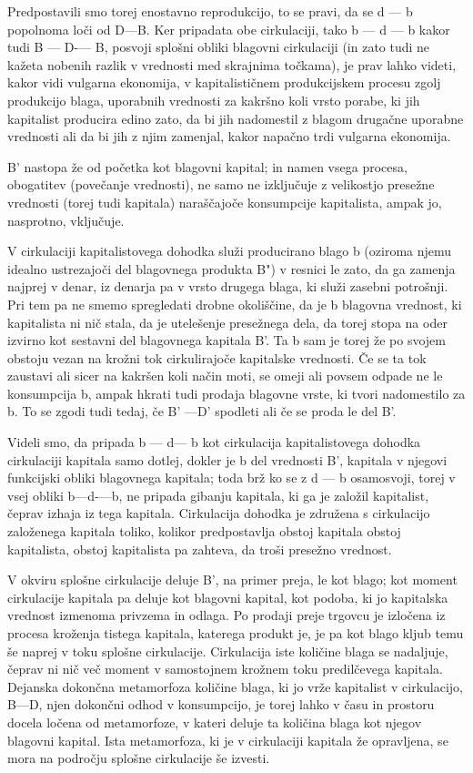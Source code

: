 \documentclass[kapital_02.tex]{subfiles}
\begin{document}
Predpostavili smo torej enostavno reprodukcijo, to se pravi, da se d — b popolnoma loči od D—B. Ker pripadata obe cirkulaciji, tako b — d — b kakor tudi B — D-— B, posvoji splošni obliki blagovni cirkulaciji (in zato tudi ne kažeta nobenih razlik v vrednosti med skrajnima točkama), je prav lahko videti, kakor vidi vulgarna ekonomija, v kapitalističnem produkcijskem procesu zgolj produkcijo blaga, uporabnih vrednosti za kakršno koli vrsto porabe, ki jih kapitalist producira edino zato, da bi jih nadomestil z blagom drugačne uporabne vrednosti ali da bi jih z njim zamenjal, kakor napačno trdi vulgarna ekonomija.

B' nastopa že od početka kot blagovni kapital; in namen vsega procesa, obogatitev (povečanje vrednosti), ne samo ne izključuje z velikostjo presežne vrednosti (torej tudi kapitala) naraščajoče konsumpcije kapitalista, ampak jo, nasprotno, vključuje.

V cirkulaciji kapitalistovega dohodka služi producirano blago b (oziroma njemu idealno ustrezajoči del blagovnega produkta B") v resnici le zato, da ga zamenja najprej v denar, iz denarja pa v vrsto drugega blaga, ki služi zasebni potrošnji. Pri tem pa ne smemo spregledati drobne okoliščine, da je b blagovna vrednost, ki kapitalista ni nič stala, da je utelešenje presežnega dela, da torej stopa na oder izvirno kot sestavni del blagovnega kapitala B'. Ta b sam je torej že po svojem obstoju vezan na krožni tok cirkulirajoče kapitalske vrednosti. Če se ta tok zaustavi ali sicer na kakršen koli način moti, se omeji ali povsem odpade ne le konsumpcija b, ampak hkrati tudi prodaja blagovne vrste, ki tvori nadomestilo za b. To se zgodi tudi tedaj, če B' —D' spodleti ali če se proda le del B'.

Videli smo, da pripada b — d— b kot cirkulacija kapitalistovega dohodka cirkulaciji kapitala samo dotlej, dokler je b del vrednosti B', kapitala v njegovi funkcijski obliki blagovnega kapitala; toda brž ko se z d — b osamosvoji, torej v vsej obliki b—d-—b, ne pripada gibanju kapitala, ki ga je založil kapitalist, čeprav izhaja iz tega kapitala. Cirkulacija dohodka je združena s cirkulacijo založenega kapitala toliko, kolikor predpostavlja obstoj kapitala obstoj kapitalista, obstoj kapitalista pa zahteva, da troši presežno vrednost.

V okviru splošne cirkulacije deluje B', na primer preja, le kot blago; kot moment cirkulacije kapitala pa deluje kot blagovni kapital, kot podoba, ki jo kapitalska vrednost izmenoma privzema in odlaga. Po prodaji preje trgovcu je izločena iz procesa kroženja tistega kapitala, katerega produkt je, je pa kot blago kljub temu še naprej v toku splošne cirkulacije. Cirkulacija iste količine blaga se nadaljuje, čeprav ni nič več moment v samostojnem krožnem toku predilčevega kapitala. Dejanska dokončna metamorfoza količine blaga, ki jo vrže kapitalist v cirkulacijo, B—D, njen dokončni odhod v konsumpcijo, je torej lahko v času in prostoru docela ločena od metamorfoze, v kateri deluje ta količina blaga kot njegov blagovni kapital. Ista metamorfoza, ki je v cirkulaciji kapitala že opravljena, se mora na področju splošne cirkulacije še izvesti.
\end{document}

